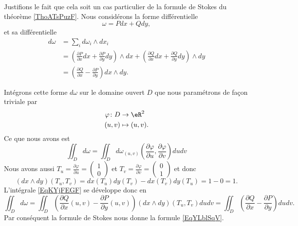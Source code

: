 Justifions le fait que cela soit un cas particulier de la formule de Stokes du théorème \ref{ThoATsPuzF}. Nous considérons la forme différentielle
\begin{equation}
    \omega=Pdx+Qdy,
\end{equation}
et sa différentielle
\begin{subequations}
    \begin{align}
    d\omega&=\sum_id\omega_i\wedge dx_i\\
    &=\left( \frac{ \partial P }{ \partial x }dx+\frac{ \partial P }{ \partial y }dy \right)\wedge dx+\left( \frac{ \partial Q }{ \partial x }dx+\frac{ \partial Q }{ \partial y }dy \right)\wedge dy\\
    &=\left( \frac{ \partial Q }{ \partial x }-\frac{ \partial P }{ \partial y } \right)dx\wedge dy.
    \end{align}
\end{subequations}

Intégrons cette forme \( d\omega\) sur le domaine ouvert \( D\) que nous paramétrons de façon triviale par
\begin{equation}
    \begin{aligned}
        \varphi\colon D&\to \eR^2 \\
        (u,v)&\mapsto (u,v).
    \end{aligned}
\end{equation}
Ce que nous avons est
\begin{equation}\label{EqKYjFEGF}
    \iint_D d\omega=\iint_D d\omega_{(u,v)}\left( \frac{ \partial \varphi }{ \partial u },\frac{ \partial \varphi }{ \partial v } \right)dudv
\end{equation}
Nous avons aussi \( T_u=\frac{ \partial \varphi }{ \partial u }=\begin{pmatrix}
    1    \\ 
    0    
\end{pmatrix}\) et \(T_v= \frac{ \partial \varphi }{ \partial v }=\begin{pmatrix}
    0    \\ 
      1  
\end{pmatrix}\) et donc 
\begin{equation}
    (dx\wedge dy)(T_u,T_v)=dx(T_u)dy(T_v)-dx(T_v)dy(T_u)=1-0=1.
\end{equation}
L'intégrale \eqref{EqKYjFEGF} se développe donc en
\begin{equation}
    \iint_Dd\omega=\iint_D\left( \frac{ \partial Q }{ \partial x }(u,v)-\frac{ \partial P }{ \partial y }(u,v) \right)(dx\wedge dy)(T_u,T_v)dudv=\iint_D\left( \frac{ \partial Q }{ \partial x }-\frac{ \partial P }{ \partial y } \right)dudv.
\end{equation}
Par conséquent la formule de Stokes nous donne la formule \eqref{EqYLblSqV}.

